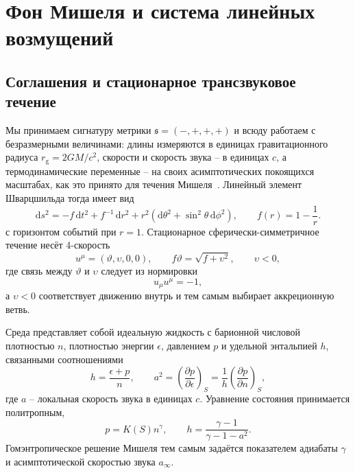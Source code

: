 \documentclass[12pt,a4paper,preprint,nopreprintline]{elsarticle}
\begin{document}
\section{Фон Мишеля и система линейных возмущений}
\label{sec:background}

\subsection{Соглашения и стационарное трансзвуковое течение}
\label{sec:michel_background}

Мы принимаем сигнатуру метрики $\mathfrak{s}=(-,+,+,+)$ и всюду работаем с безразмерными величинами: длины измеряются в единицах гравитационного радиуса $r_{\mathrm{g}}=2GM/c^{2}$, скорости и скорость звука -- в единицах $c$, а термодинамические переменные -- на своих асимптотических покоящихся масштабах, как это принято для течения Мишеля~\cite{MichelFC_AccretionOfMatterByCondensedObjects_1972,MoncriefV_StabilityOfStationarySphericalAccretionOntoASchwarzschildBlackHole_1980}. Линейный элемент Шварцшильда тогда имеет вид
\begin{equation}
    \mathrm{d}s^{2}
    =
    -f\,\mathrm{d}t^{2}
    +f^{-1}\,\mathrm{d}r^{2}
    +r^{2}
    \left(
        \mathrm{d}\theta^{2}
        +\sin^{2}\theta\,\mathrm{d}\phi^{2}
    \right),
    \qquad
    f(r)=1-\frac{1}{r}.
    \label{eq:schwarzschild_metric}
\end{equation}
с горизонтом событий при $r=1$. Стационарное сферически-симметричное течение несёт 4-скорость
\begin{equation}
    u^{\mu}=(\vartheta,\upsilon,0,0),
    \qquad
    f\vartheta=\sqrt{f+\upsilon^{2}},
    \qquad
    \upsilon<0,
    \label{eq:background_velocity}
\end{equation}
где связь между $\vartheta$ и $\upsilon$ следует из нормировки
\begin{equation}
    u_{\mu}u^{\mu}=-1,
    \label{eq:four_velocity_normalization}
\end{equation}
а $\upsilon<0$ соответствует движению внутрь и тем самым выбирает аккреционную ветвь.

Среда представляет собой идеальную жидкость с барионной числовой плотностью $n$, плотностью энергии $\epsilon$, давлением $p$ и удельной энтальпией $h$, связанными соотношениями
\begin{equation}
    h=\frac{\epsilon+p}{n},
    \qquad
    a^{2}=
    \left(\frac{\partial p}{\partial\epsilon}\right)_{S}=
    \frac{1}{h}\left(\frac{\partial p}{\partial n}\right)_{S},
    \label{eq:enthalpy_sound_speed}
\end{equation}
где $a$ -- локальная скорость звука в единицах $c$. Уравнение состояния принимается политропным,
\begin{equation}
    p=K(S)n^{\gamma},
    \qquad
    h=\frac{\gamma-1}{\gamma-1-a^{2}}.
    \label{eq:polytropic_closure}
\end{equation}
Гомэнтропическое решение Мишеля тем самым задаётся показателем адиабаты $\gamma$ и асимптотической скоростью звука $a_{\infty}$.
\end{document}
